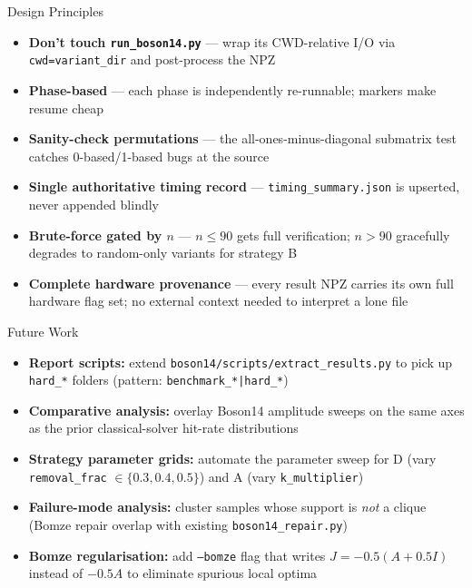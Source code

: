 \documentclass[aspectratio=169]{beamer}
\begin{document}

\begin{frame}{Design Principles}
    \begin{itemize}
        \item \textbf{Don't touch \texttt{run\_boson14.py}} --- wrap its CWD-relative I/O via \texttt{cwd=variant\_dir} and post-process the NPZ
        \item \textbf{Phase-based} --- each phase is independently re-runnable; markers make resume cheap
        \item \textbf{Sanity-check permutations} --- the all-ones-minus-diagonal submatrix test catches 0-based/1-based bugs at the source
        \item \textbf{Single authoritative timing record} --- \texttt{timing\_summary.json} is upserted, never appended blindly
        \item \textbf{Brute-force gated by $n$} --- $n \leq 90$ gets full verification; $n > 90$ gracefully degrades to random-only variants for strategy B
        \item \textbf{Complete hardware provenance} --- every result NPZ carries its own full hardware flag set; no external context needed to interpret a lone file
    \end{itemize}
\end{frame}


\begin{frame}{Future Work}
    \begin{itemize}
        \item \textbf{Report scripts:} extend \texttt{boson14/scripts/extract\_results.py} to pick up \texttt{hard\_*} folders (pattern: \texttt{benchmark\_*|hard\_*})
        \item \textbf{Comparative analysis:} overlay Boson14 amplitude sweeps on the same axes as the prior classical-solver hit-rate distributions
        \item \textbf{Strategy parameter grids:} automate the parameter sweep for D (vary \texttt{removal\_frac} $\in \{0.3, 0.4, 0.5\}$) and A (vary \texttt{k\_multiplier})
        \item \textbf{Failure-mode analysis:} cluster samples whose support is \emph{not} a clique (Bomze repair overlap with existing \texttt{boson14\_repair.py})
        \item \textbf{Bomze regularisation:} add \texttt{--bomze} flag that writes $J = -0.5(A + 0.5I)$ instead of $-0.5A$ to eliminate spurious local optima
    \end{itemize}
\end{frame}
\end{document}
